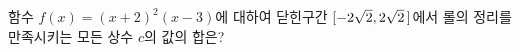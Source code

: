 함수 $f(x)=(x+2)^2(x-3)$에 대하여 닫힌구간 $[-2\sqrt{2}{,}\mkern3mu\mathopen{}2\sqrt{2}\mkern3mu ]$에서 롤의 정리를 만족시키는 모든 상수 $c$의 값의 합은?
